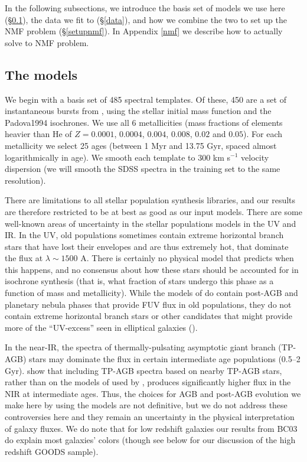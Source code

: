 \documentclass[12pt,preprint]{aastex}
\renewcommand{\AA}{A}
\newcounter{address}
\begin{document}
In the following subsections, we introduce the basis set of models we
use here (\S\ref{models}), the data we fit to (\S\ref{data}), and how
we combine the two to set up the NMF problem (\S\ref{setupnmf}).  In
Appendix \ref{nmf} we describe how to actually solve to NMF problem.

\subsection{The models}
\label{models}

We begin with a basis set of 485 spectral templates. Of these, 450 are
a set of instantaneous bursts from \citet{bruzual03a}, using the
\citet{chabrier03a} stellar initial mass function and the Padova1994
isochrones. We use all 6 metallicities (mass fractions of elements
heavier than He of $Z= 0.0001$, $0.0004$, $0.004$, $0.008$, $0.02$ and
$0.05$).  For each metallicity we select 25 ages (between 1 Myr and
13.75 Gyr, spaced almost logarithmically in age).  We smooth each
template to $300$ km s$^{-1}$ velocity dispersion (we will smooth the
SDSS spectra in the training set to the same resolution).

There are limitations to all stellar population synthesis libraries,
and our results are therefore restricted to be at best as good as our
input models. There are some well-known areas of uncertainty in the
stellar populations models in the UV and IR. In the UV, old
populations sometimes contain extreme horizontal branch stars that
have lost their envelopes and are thus extremely hot, that dominate
the flux at $\lambda \sim 1500$ \AA. There is certainly no physical
model that predicts when this happens, and no consensus about how
these stars should be accounted for in isochrone synthesis (that is,
what fraction of stars undergo this phase as a function of mass and
metallicity). While the models of \cite{bruzual03a} do contain
post-AGB and planetary nebula phases that provide FUV flux in old
populations, they do not contain extreme horizontal branch stars or
other candidates that might provide more of the ``UV-excess'' seen in
elliptical galaxies (\citealt{greggio90a, brown00a}).  

In the near-IR, the spectra of thermally-pulsating asymptotic giant
branch (TP-AGB) stars may dominate the flux in certain intermediate
age populations (0.5--2 Gyr).  \citet{maraston05a} show that including
TP-AGB spectra based on nearby TP-AGB stars, rather than on the models
of \citet{vassiliadis93a} used by \citet{bruzual03a}, produces
significantly higher flux in the NIR at intermediate ages. Thus, the
choices for AGB and post-AGB evolution we make here by using the
models \cite{bruzual03a} are not definitive, but we do not address
these controversies here and they remain an uncertainty in the
physical interpretation of galaxy fluxes.  We do note that for low
redshift galaxies our results from BC03 do explain most galaxies'
colors (though see below for our discussion of the high redshift GOODS
sample).
\end{document}
